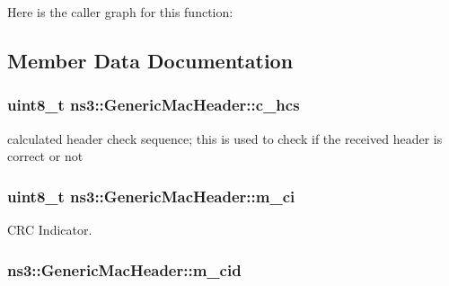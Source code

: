 Here is the caller graph for this function\+:




\subsection{Member Data Documentation}
\subsubsection[{\texorpdfstring{c\+\_\+hcs}{c_hcs}}]{\setlength{\rightskip}{0pt plus 5cm}uint8\+\_\+t ns3\+::\+Generic\+Mac\+Header\+::c\+\_\+hcs\hspace{0.3cm}{\ttfamily [private]}}\hypertarget{classns3_1_1GenericMacHeader_aeef38ec340d4a5d1a28a52aca4c3341b}{}\label{classns3_1_1GenericMacHeader_aeef38ec340d4a5d1a28a52aca4c3341b}


calculated header check sequence; this is used to check if the received header is correct or not 

\subsubsection[{\texorpdfstring{m\+\_\+ci}{m_ci}}]{\setlength{\rightskip}{0pt plus 5cm}uint8\+\_\+t ns3\+::\+Generic\+Mac\+Header\+::m\+\_\+ci\hspace{0.3cm}{\ttfamily [private]}}\hypertarget{classns3_1_1GenericMacHeader_ac963f44cb95647ccba2d650005f8ed60}{}\label{classns3_1_1GenericMacHeader_ac963f44cb95647ccba2d650005f8ed60}


C\+RC Indicator. 

\subsubsection[{\texorpdfstring{m\+\_\+cid}{m_cid}}]{ ns3\+::\+Generic\+Mac\+Header\+::m\+\_\+cid\hspace{0.3cm}{\ttfamily [private]}}\hypertarget{classns3_1_1GenericMacHeader_aaef3e7fcc428b7efb07fff44159f5606}{}\label{classns3_1_1GenericMacHeader_aaef3e7fcc428b7efb07fff44159f5606}


